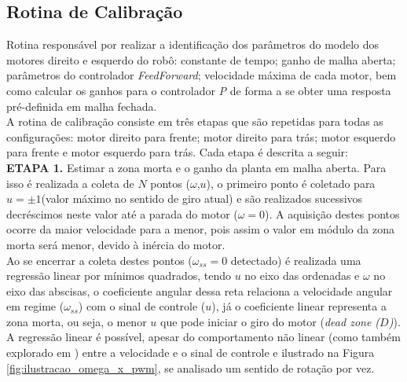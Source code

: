 \subsection{Rotina de Calibração}
\label{subsec:rotina_calibracao}

Rotina responsável por realizar a identificação dos parâmetros do modelo dos motores direito e esquerdo do robô: constante de tempo; ganho de malha aberta; parâmetros do controlador \emph{FeedForward}; velocidade máxima de cada motor, bem como calcular os ganhos para o controlador \emph{P} de forma a se obter uma resposta pré-definida em malha fechada.\\

A rotina de calibração consiste em três etapas que são repetidas para todas as configurações: motor direito para frente; motor direito para trás; motor esquerdo para frente e motor esquerdo para trás. Cada etapa é descrita a seguir: \\


\textbf{ETAPA 1.} Estimar a zona morta e o ganho da planta em malha aberta. Para isso é realizada a coleta de $N$ pontos ($\omega$,$u$), o primeiro ponto é coletado para $u = \pm1$(valor máximo no sentido de giro atual) e são realizados sucessivos decréscimos neste valor até a parada do motor ($\omega = 0$). A aquisição destes pontos ocorre da maior velocidade para a menor, pois assim o valor em módulo da zona morta será menor, devido à inércia do motor.\\

Ao se encerrar a coleta destes pontos ($\omega_{ss} = 0$ detectado) é realizada uma regressão linear por mínimos quadrados, tendo $u$ no eixo das ordenadas e $\omega$ no eixo das abscisas, o coeficiente angular dessa reta relaciona a velocidade angular em regime ($\omega_{ss}$) com o sinal de controle ($u$), já o coeficiente linear representa a zona morta, ou seja, o menor $u$ que pode iniciar o giro do motor (\emph{dead zone ($D$)}). A regressão linear é possível, apesar do comportamento não linear (como também explorado em \cite{dead_zone}) entre a velocidade e o sinal de controle e ilustrado na Figura \ref{fig:ilustracao_omega_x_pwm}, se analisado um sentido de rotação por vez.

